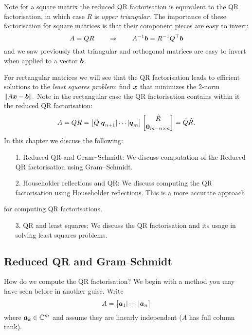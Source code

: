 Note for a square matrix the reduced QR factorisation is equivalent to the QR factorisation, in which case $R$ is \emph{upper triangular}. The importance of these factorisation for square matrices is that their component pieces are easy to invert:
\[
A = QR \qquad \Rightarrow \qquad A^{-1}\bm{{\mbox{\boldmath$b$\unboldmath}}} = R^{-1} Q^\top \bm{{\mbox{\boldmath$b$\unboldmath}}}
\]
and we saw previously that triangular and orthogonal matrices are easy to invert when applied to a vector $\bm{{\mbox{\boldmath$b$\unboldmath}}}$.

For rectangular matrices we will see that the QR factorisation leads to efficient solutions to the \emph{least squares problem}: find $\bm{{\mbox{\boldmath$x$\unboldmath}}}$ that minimizes the 2-norm $\| A \bm{{\mbox{\boldmath$x$\unboldmath}}} - \bm{{\mbox{\boldmath$b$\unboldmath}}} \|.$ Note in the rectangular case the QR factorisation contains within it the reduced QR factorisation:
\[
A = QR = \begin{bmatrix} \hat Q | \bm{{\mbox{\boldmath$q$\unboldmath}}}_{n+1} | \cdots | \bm{{\mbox{\boldmath$q$\unboldmath}}}_m \end{bmatrix} \begin{bmatrix} \hat R \\  \bm{{\mbox{\boldmath$0$\unboldmath}}}_{m-n \times n} \end{bmatrix} = \hat Q \hat R.
\]
In this chapter we discuss the following:

\begin{itemize}
\item[1. ] Reduced QR and Gram\ensuremath{\endash}Schmidt: We discuss computation of the Reduced QR factorisation using Gram\ensuremath{\endash}Schmidt.


\item[2. ] Householder reflections and QR: We discuss computing the  QR factorisation using Householder reflections. This is a more accurate approach

\end{itemize}
for computing QR factorisations.

\begin{itemize}
\item[3. ] QR and least squares: We discuss the QR factorisation and its usage in solving least squares problems.

\end{itemize}
\subsection{Reduced QR and Gram\ensuremath{\endash}Schmidt}
How do we compute the QR factorisation? We begin with a method you may have seen before in another guise. Write
\[
A = \begin{bmatrix} \bm{{\mbox{\boldmath$a$\unboldmath}}}_1 | \cdots | \bm{{\mbox{\boldmath$a$\unboldmath}}}_n \end{bmatrix}
\]
where $\bm{{\mbox{\boldmath$a$\unboldmath}}}_k \in  {\mathbb C}^m$ and assume they are linearly independent ($A$ has full column rank).

